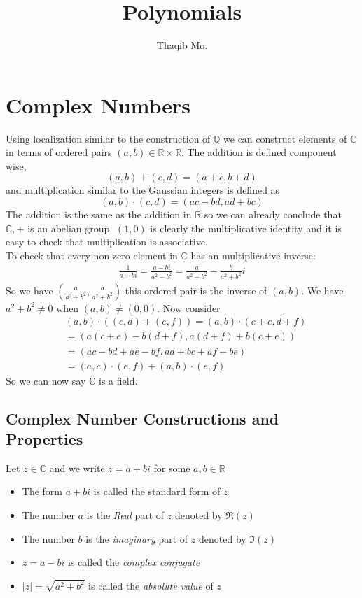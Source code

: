 \documentclass[16pt,a4paper]{article}
\author{Thaqib Mo.}
\title{ Polynomials }
\theoremstyle{definition}
\newcommand{\C}{\mathbb{C}}
\newcommand{\R}{\mathbb{R}}
\begin{document}
\maketitle
\newpage
\section{Complex Numbers}
Using localization similar to the construction of $\mathbb{Q}$ we can construct elements of $\C$ in terms of ordered pairs $(a,b)\in \R\times \R$. The addition is defined component wise, 
\[(a,b) + (c,d) = (a+c,b+d)\]
and multiplication similar to the Gaussian integers is defined as
\[(a,b)\cdot (c,d) = (ac-bd, ad+bc)\]
The addition is the same as the addition in $\R$ so we can already conclude that $\C,+$ is an abelian group. $(1,0)$ is clearly the multiplicative identity and it is easy to check that multiplication is associative. 
\\
To check that every non-zero element in $\C$ has an multiplicative inverse: 
\begin{align*}
\frac{1}{a+bi} = \frac{a-bi}{a^2 + b^2} = \frac{a}{a^2+b^2} - \frac{b}{a^2+b^2}i
\end{align*}
So we have $\left( \frac{a}{a^2+b^2}, \frac{b}{a^2+b^2}\right)$ this ordered pair is the inverse of $(a,b)$. We have $a^2 + b^2 \neq 0$ when $(a,b)\neq (0,0)$. Now consider 
\begin{align*}
& (a,b)\cdot ((c,d)+(e,f)) = (a,b)\cdot (c+e,d+f) \\
& = \left(a(c+e) - b(d+f), a(d+f) + b(c+e)\right) \\
& = \left(ac- bd + ae -bf, ad+ bc +af +be\right) \\
& = (a,c)\cdot (e,f) + (a,b)\cdot (e,f)
\end{align*} 
So we can now say $\C$ is a field. 

\subsection{Complex Number Constructions and Properties}
\begin{defn}{}{}
Let $z\in\C$ and we write $z=a+bi$ for some $a,b \in \R$
\begin{itemize}
\item The form $a+bi$ is called the standard form of $z$ 
\item The number $a$ is the \emph{Real} part of $z$ denoted by $\Re(z)$ 
\item The number $b$ is the \emph{imaginary} part of $z$ denoted by $\Im(z)$
\item $\bar{z} = a-bi$ is called the \emph{complex conjugate}
\item $|z| = \sqrt{a^2 + b^2}$ is called the \emph{absolute value} of $z$
\end{itemize}
\end{defn}
\end{document}
